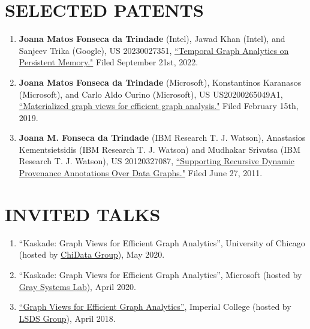 \documentclass[centered,overlapped]{res}
\begin{document}
\begin{resume}
\section{SELECTED PATENTS}
\begin{enumerate}
  \item \textbf{Joana Matos Fonseca da Trindade} (Intel), Jawad Khan (Intel), and Sanjeev Trika (Google), US 20230027351, \href{https://patents.justia.com/patent/20230027351}{``Temporal Graph Analytics on Persistent Memory."} Filed September 21st, 2022.
  \item \textbf{Joana Matos Fonseca da Trindade} (Microsoft), Konstantinos Karanasos (Microsoft), and Carlo Aldo Curino (Microsoft), US US20200265049A1, \href{https://patents.google.com/patent/US20200265049A1/en}{``Materialized graph views for efficient graph analysis."} Filed February 15th, 2019.
  \item \textbf{Joana M. Fonseca da Trindade} (IBM Research T. J. Watson), Anastasios Kementsietsidis (IBM Research T. J. Watson) and Mudhakar Srivatsa (IBM Research T. J. Watson), US 20120327087, \href{http://www.faqs.org/patents/app/20120327087}{``Supporting Recursive Dynamic Provenance Annotations Over Data Graphs."} Filed June 27, 2011.
\end{enumerate}

\section{INVITED TALKS}
\begin{enumerate}
  \item ``Kaskade: Graph Views for Efficient Graph Analytics'', University of Chicago (hosted by \href{https://data.cs.uchicago.edu/}{ChiData Group}), May 2020.
  \item ``Kaskade: Graph Views for Efficient Graph Analytics'', Microsoft (hosted by \href{https://azuredata.microsoft.com}{Gray Systems Lab}), April 2020.
  \item \href{http://lsds.doc.ic.ac.uk/content/graph-views-efficient-graph-analytics-collaboration-microsoft-cisl}{``Graph Views for Efficient Graph Analytics''}, Imperial College (hosted by \href{https://lsds.doi.ic.ac.uk}{LSDS Group}), April 2018.
\end{enumerate}


\end{resume}
\end{document}
